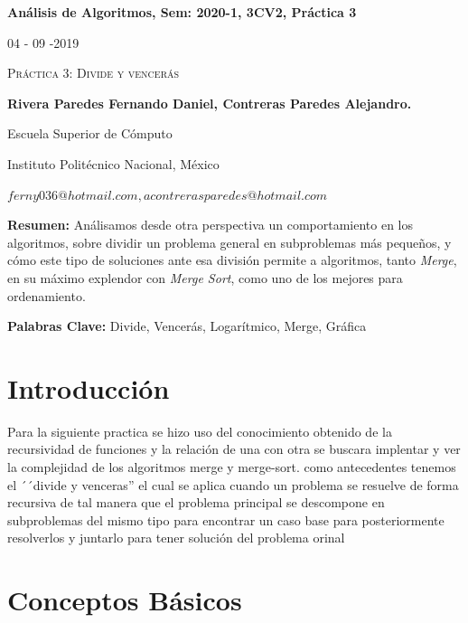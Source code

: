 \documentclass[12pt,twoside]{article}
\begin{document}
\centerline{\bf An\'alisis de Algoritmos, Sem: 2020-1, 3CV2, Pr\'actica 3}
\centerline{}
\centerline{04 - 09 -2019}
\begin{center}
\Large{\textsc{Pr\'actica 3: Divide y vencerás}}
\end{center}
\centerline{}
\centerline{\bf {Rivera Paredes Fernando Daniel, Contreras Paredes Alejandro.}}
\centerline{}
\centerline{Escuela Superior de C\'omputo}
\centerline{Instituto Polit\'ecnico Nacional, M\'exico}
\centerline{$ferny036@hotmail.com, acontrerasparedes@hotmail.com$}
\newtheorem{Theorem}{\quad Theorem}[section] \newtheorem{Definition}[Theorem]{\quad Definition} \newtheorem{Corollary}[Theorem]{\quad Corollary} \newtheorem{Lemma}[Theorem]{\quad Lemma} \newtheorem{Example}[Theorem]{\quad Example} \bigskip
\textbf{Resumen:} Análisamos desde otra perspectiva un comportamiento en los algoritmos, sobre dividir un problema general en subproblemas más pequeños, y cómo este tipo
de soluciones ante esa división permite a algoritmos, tanto \textit{Merge}, en su máximo explendor con \textit{Merge Sort}, como uno de los mejores para
ordenamiento.

\centerline{}
{\bf Palabras Clave:} Divide, Vencerás, Logarítmico, Merge, Gráfica
\newpage

\section{Introducción}
Para la siguiente practica se hizo uso del conocimiento obtenido de la recursividad de funciones y la relaci\'on de una con otra se buscara implentar y ver la complejidad 
de los algoritmos merge y merge-sort. como antecedentes tenemos el ´´divide y venceras'' el cual se aplica cuando un problema se resuelve de forma recursiva
de tal manera que el problema principal se descompone en subproblemas del mismo tipo para encontrar un caso base para posteriormente resolverlos y juntarlo para tener soluci\'on del problema orinal


\section{Conceptos B\'asicos} 
\end{document}
